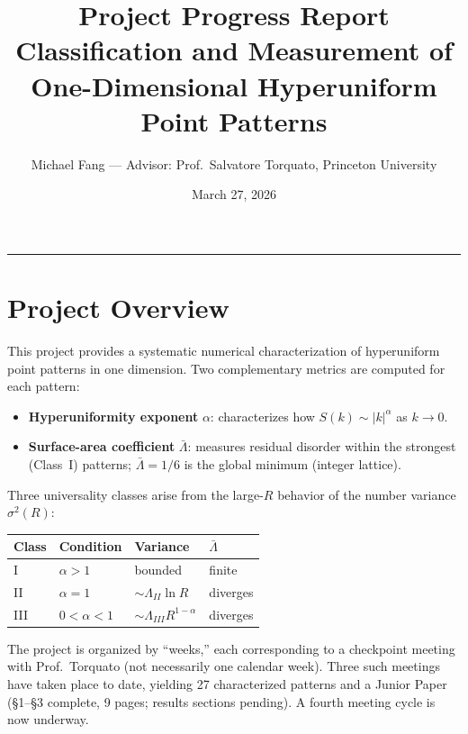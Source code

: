 \documentclass[11pt,letterpaper]{article}
\title{\textbf{Project Progress Report}\\[0.3em]
  \large Classification and Measurement of One-Dimensional Hyperuniform Point Patterns}
\author{Michael Fang \quad --- \quad Advisor: Prof.\ Salvatore Torquato, Princeton University}
\date{March 27, 2026}
\begin{document}
\maketitle
\tableofcontents
\vspace{1em}
\noindent\rule{\linewidth}{0.4pt}

\section{Project Overview}

This project provides a systematic numerical characterization of hyperuniform point
patterns in one dimension. Two complementary metrics are computed for each pattern:
\begin{itemize}[noitemsep]
  \item \textbf{Hyperuniformity exponent} $\alpha$: characterizes how $S(k) \sim |k|^\alpha$
        as $k \to 0$.
  \item \textbf{Surface-area coefficient} $\bar\Lambda$: measures residual disorder within
        the strongest (Class~I) patterns; $\bar\Lambda = 1/6$ is the global minimum (integer lattice).
\end{itemize}

\noindent Three universality classes arise from the large-$R$ behavior of the number
variance $\sigma^2(R)$:

\vspace{0.4em}
\noindent\begin{tabular}{llll}
\toprule
\textbf{Class} & \textbf{Condition} & \textbf{Variance} & \textbf{$\bar\Lambda$} \\
\midrule
I   & $\alpha > 1$ & bounded                 & finite \\
II  & $\alpha = 1$ & $\sim \Lambda_{II} \ln R$     & diverges \\
III & $0 < \alpha < 1$ & $\sim \Lambda_{III} R^{1-\alpha}$ & diverges \\
\bottomrule
\end{tabular}
\vspace{0.5em}

\noindent The project is organized by ``weeks,'' each corresponding to a checkpoint meeting
with Prof.\ Torquato (not necessarily one calendar week). Three such meetings have
taken place to date, yielding 27 characterized patterns and a Junior Paper
(§1--§3 complete, 9 pages; results sections pending). A fourth meeting cycle
is now underway.
\end{document}

